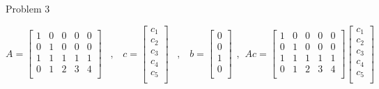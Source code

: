 \begin{problem}{Problem 3}
\begin{Highlight}[Solution]
        \begin{equation}
            A = 
            \begin{bmatrix}
                1 & 0 & 0 & 0 & 0 \\
                0 & 1 & 0 & 0 & 0 \\
                1 & 1 & 1 & 1 & 1 \\
                0 & 1 & 2 & 3 & 4 \\
            \end{bmatrix}
            \hspace{10pt} , \hspace{10pt}
            c = 
            \begin{bmatrix}
                c_{1} \\
                c_{2} \\
                c_{3} \\
                c_{4} \\
                c_{5} \\
            \end{bmatrix}
            \hspace{10pt} , \hspace{10pt}
            b = 
            \begin{bmatrix}
                0 \\
                0 \\
                1 \\
                0 \\
            \end{bmatrix}
            \hspace{5pt} , \hspace{5pt}
            Ac = 
            \begin{bmatrix}
                1 & 0 & 0 & 0 & 0 \\
                0 & 1 & 0 & 0 & 0 \\
                1 & 1 & 1 & 1 & 1 \\
                0 & 1 & 2 & 3 & 4 \\
            \end{bmatrix}
            \begin{bmatrix}
                c_{1} \\
                c_{2} \\
                c_{3} \\
                c_{4} \\
                c_{5} \\

\end{bmatrix}
\end{equation}
\end{Highlight}
\end{problem}
